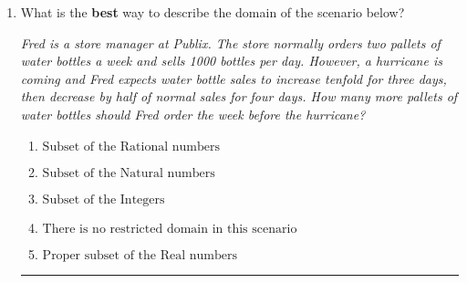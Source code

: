 \documentclass[14pt]{extbook}
\newcommand{\litem}[1]{\item#1\hspace*{-1cm}\rule{\textwidth}{0.4pt}}
\begin{document}
\begin{enumerate}
{\begin{enumerate}[label=\Alph*.]
\end{enumerate} }
\litem{
What is the \textbf{best} way to describe the domain of the scenario below?
\begin{center}
    \textit{ Fred is a store manager at Publix. The store normally orders two pallets of water bottles a week and sells 1000 bottles per day. However, a hurricane is coming and Fred expects water bottle sales to increase tenfold for three days, then decrease by half of normal sales for four days. How many more pallets of water bottles should Fred order the week before the hurricane? }
\end{center}
\begin{enumerate}[label=\Alph*.]
\item \( \text{Subset of the Rational numbers} \)
\item \( \text{Subset of the Natural numbers} \)
\item \( \text{Subset of the Integers} \)
\item \( \text{There is no restricted domain in this scenario} \)
\item \( \text{Proper subset of the Real numbers} \)

\end{enumerate} }
\end{enumerate}
\end{document}
